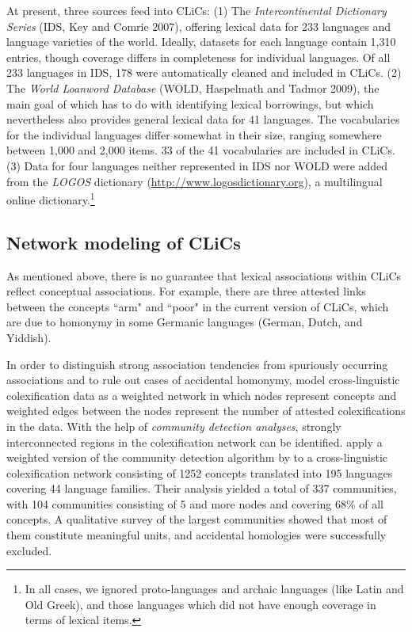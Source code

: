 At present, three sources feed into CLiCs: (1) The \emph{Intercontinental Dictionary Series} (IDS, Key and
Comrie 2007), offering lexical data for 233 languages and language varieties of the world. Ideally,
datasets for each language contain 1,310 entries, though coverage differs in completeness for
individual languages. Of all 233 languages in IDS, 178 were automatically cleaned and included in
CLiCs. (2) The \emph{World Loanword Database} (WOLD, Haspelmath and Tadmor 2009), the main goal of which
has to do with identifying lexical borrowings, but which nevertheless also provides general lexical
data for 41 languages. The vocabularies for the individual languages differ somewhat in their size,
ranging somewhere between 1,000 and 2,000 items. 33 of the 41 vocabularies are included in CLiCs.
(3) Data for four languages neither represented in IDS nor WOLD were added from the \emph{LOGOS} dictionary
(\url{http://www.logosdictionary.org}), a multilingual online dictionary.\footnote{In all cases, we ignored proto-languages and
archaic languages (like Latin and Old Greek), and those languages which
did not have enough coverage in terms of lexical items.}


\subsection{Network modeling of CLiCs}
As mentioned above, there is no guarantee that lexical associations within CLiCs reflect conceptual associations. For example, there are three attested links between the
concepts ``arm" and ``poor" in the current version of CLiCs, which are due to homonymy in some
Germanic languages (German, Dutch, and Yiddish).
 
In order to distinguish strong
association tendencies from
spuriously occurring associations and to rule out cases of accidental homonymy,  model cross-linguistic colexification data as a weighted network
in which nodes represent concepts and weighted edges between the nodes represent the number of
attested colexifications in the data.  With the help of \emph{community detection analyses}, strongly
interconnected regions in the colexification network can be identified.  apply
a weighted version of the community detection algorithm by  to a
cross-linguistic colexification network consisting of 1252 concepts translated into 195 languages
covering 44 language families. Their analysis yielded a total of 337 communities, with 104 communities
consisting of 5 and more nodes and covering 68\% of all concepts. A qualitative survey of the
largest communities showed that most of them constitute meaningful units, and accidental homologies
were successfully excluded.

